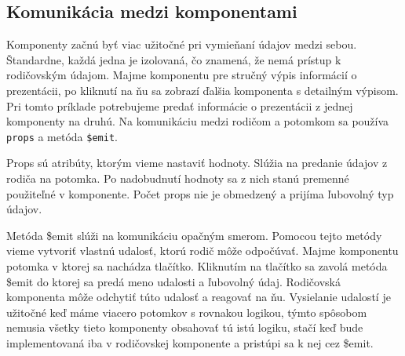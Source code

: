 \subsection*{Komunikácia medzi komponentami}
Komponenty začnú byť viac užitočné pri vymieňaní údajov medzi sebou. Štandardne, každá jedna je izolovaná, čo znamená, že nemá prístup k rodičovským údajom. Majme komponentu pre stručný výpis informácií o prezentácii, po kliknutí na ňu sa zobrazí ďalšia komponenta s detailným výpisom. Pri tomto príklade potrebujeme predať informácie o prezentácii z jednej komponenty na druhú. Na komunikáciu medzi rodičom a potomkom sa používa \texttt{props} a metóda \texttt{\$emit}.

Props sú atribúty, ktorým vieme nastaviť hodnoty. Slúžia na predanie údajov z rodiča na potomka. Po nadobudnutí hodnoty sa z nich stanú premenné použiteľné v komponente. Počet props nie je obmedzený a prijíma ľubovolný typ údajov.

Metóda \$emit slúži na komunikáciu opačným smerom. Pomocou tejto metódy vieme vytvoriť vlastnú udalosť, ktorú rodič môže odpočúvať. Majme komponentu potomka v ktorej sa nachádza tlačítko. Kliknutím na tlačítko sa zavolá metóda \$emit do ktorej sa predá meno udalosti a ľubovolný údaj. Rodičovská komponenta môže odchytiť túto udalosť a reagovať na ňu. Vysielanie udalostí je užitočné keď máme viacero potomkov s rovnakou logikou, týmto spôsobom nemusia všetky tieto komponenty obsahovať tú istú logiku, stačí keď bude implementovaná iba v rodičovskej komponente a pristúpi sa k nej cez \$emit.

